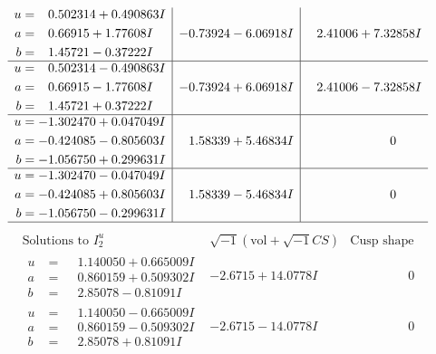 \documentclass[1p]{elsarticle_modified}
\theoremstyle{definition}
\newcommand{\I}{\sqrt{-1}}
\begin{document}
$$\begin{array}{c|c|c}
\begin{aligned}
u &= \phantom{-}0.502314 + 0.490863 I \\
a &= \phantom{-}0.66915 + 1.77608 I \\
b &= \phantom{-}1.45721 - 0.37222 I\end{aligned}
 & -0.73924 - 6.06918 I & \phantom{-}2.41006 + 7.32858 I \\ \hline\begin{aligned}
u &= \phantom{-}0.502314 - 0.490863 I \\
a &= \phantom{-}0.66915 - 1.77608 I \\
b &= \phantom{-}1.45721 + 0.37222 I\end{aligned}
 & -0.73924 + 6.06918 I & \phantom{-}2.41006 - 7.32858 I \\ \hline\begin{aligned}
u &= -1.302470 + 0.047049 I \\
a &= -0.424085 - 0.805603 I \\
b &= -1.056750 + 0.299631 I\end{aligned}
 & \phantom{-}1.58339 + 5.46834 I & \phantom{-0.000000 } 0 \\ \hline\begin{aligned}
u &= -1.302470 - 0.047049 I \\
a &= -0.424085 + 0.805603 I \\
b &= -1.056750 - 0.299631 I\end{aligned}
 & \phantom{-}1.58339 - 5.46834 I & \phantom{-0.000000 } 0\\
 \hline 
 \end{array}$$\newpage$$\begin{array}{c|c|c}  
\text{Solutions to }I^u_{2}& \I (\text{vol} + \sqrt{-1}CS) & \text{Cusp shape}\\
 \hline 
\begin{aligned}
u &= \phantom{-}1.140050 + 0.665009 I \\
a &= \phantom{-}0.860159 + 0.509302 I \\
b &= \phantom{-}2.85078 - 0.81091 I\end{aligned}
 & -2.6715 + 14.0778 I & \phantom{-0.000000 } 0 \\ \hline\begin{aligned}
u &= \phantom{-}1.140050 - 0.665009 I \\
a &= \phantom{-}0.860159 - 0.509302 I \\
b &= \phantom{-}2.85078 + 0.81091 I\end{aligned}
 & -2.6715 - 14.0778 I & \phantom{-0.000000 } 0 \\ \hline\begin{aligned}

\end{aligned}
\end{array}$$
\end{document}
